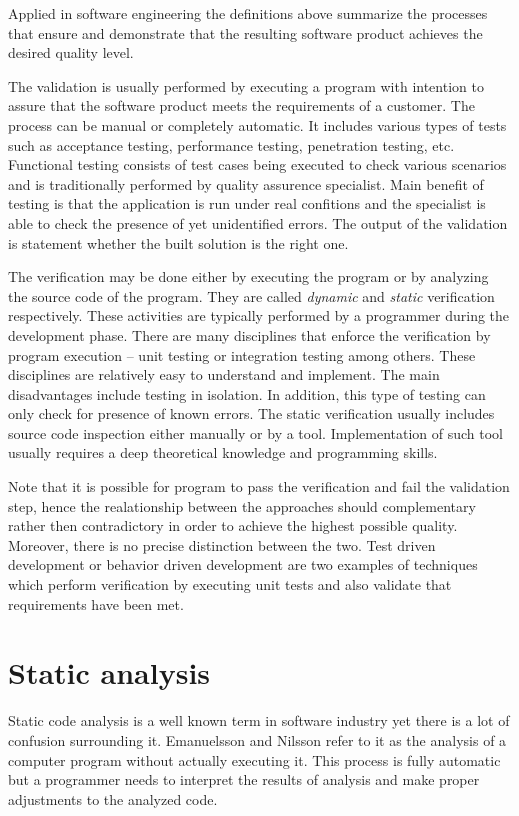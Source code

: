 \documentclass[12pt,final,oneside]{fithesis2}
\theoremstyle{definition}
\begin{document}
Applied in software engineering the definitions above summarize the
processes that ensure and demonstrate that the resulting software product
achieves the desired quality level.

The validation is usually performed by executing a program with intention
to assure that the software product meets the requirements of a customer.
The process can be manual or completely automatic. It includes
various types of tests such as acceptance testing, performance testing,
penetration testing, etc. Functional testing consists of test cases
being executed to check various scenarios and is traditionally performed
by quality assurence specialist. Main benefit of testing is that the
application is run under real confitions and the specialist is able to
check the presence of yet unidentified errors. The output of the validation
is statement whether the built solution is the right one.

The verification may be done either by executing the program or by
analyzing the source code of the program. They are called \textit{dynamic}
and \textit{static} verification respectively. These activities are
typically performed by a programmer during the development phase.
There are many disciplines that enforce the verification by program
execution -- unit testing or integration testing among others. These
disciplines are relatively easy to understand and implement. The main
disadvantages include testing in isolation. In addition, this type of
testing can only check for presence of known errors. The static
verification usually includes source code inspection either manually or
by a tool. Implementation of such tool usually requires a deep
theoretical knowledge and programming skills.

Note that it is possible for program to pass the verification and
fail the validation step, hence the realationship between the approaches
should complementary rather then contradictory in order to achieve the
highest possible quality. Moreover, there is no
precise distinction between the two. Test driven development or behavior
driven development are two examples of techniques which perform
verification by executing unit tests and also validate that requirements
have been met.


\section{Static analysis}

Static code analysis is a well known term in software industry yet there
is a lot of confusion surrounding it. Emanuelsson and Nilsson
\cite{EmanuelssonNilsson08-1} refer to it as the analysis of a computer
program without actually executing it. This process is fully automatic
but a programmer needs to interpret the results of analysis and make
proper adjustments to the analyzed code.
\end{document}
